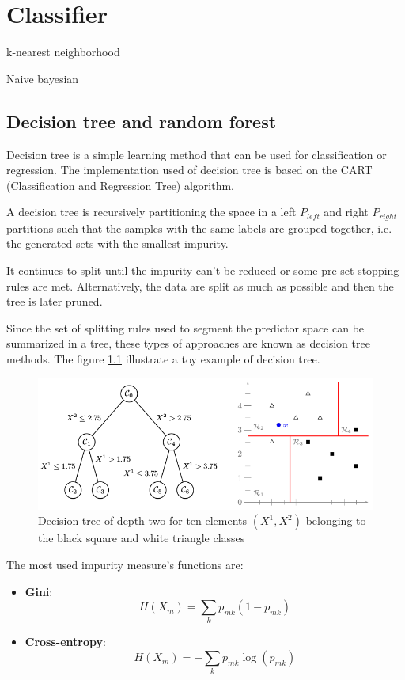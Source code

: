 \chapter{Classifier}

k-nearest neighborhood

Naive bayesian

\section{Decision tree and random forest}

Decision tree is a simple learning method that can be used for classification or regression. The implementation used of decision tree is based on the CART (Classification and Regression Tree) algorithm.

A decision tree is recursively partitioning the space in a left $P_{left}$ and right $P_{right}$ partitions such that the samples with the same labels are grouped together, i.e. the generated sets with the smallest impurity.

It continues to split until the impurity can't be reduced or some pre-set stopping rules are met. Alternatively, the data are split as much as possible and then the tree is later pruned.

Since the set of splitting rules used to segment the predictor space can be summarized in a tree, these types of approaches are known as decision tree methods. The figure  \ref{fig:decision_tree_simple_example} illustrate a toy example of decision tree.

\begin{figure}[h]
    \includegraphics[scale=0.5]{img/decision_tree_simple_example}
    \caption[Decision tree of for ten elements belonging to two classes]{Decision tree of depth two for ten elements $(X^1, X^2)$ belonging to the black square and white triangle classes}
    \label{fig:decision_tree_simple_example}
\end{figure}

The most used impurity measure's functions are:
\begin{itemize}
    \item \textbf{Gini}: $$H(X_m) = \sum_k p_{mk} (1 - p_{mk})$$
    \item \textbf{Cross-entropy}: $$ H(X_m) = - \sum_k p_{mk} \log(p_{mk}) $$
\end{itemize}

